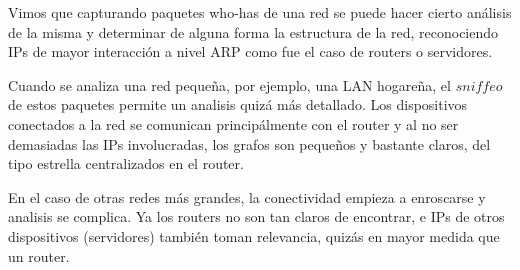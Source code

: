 Vimos que capturando paquetes who-has de una red se puede hacer cierto análisis
de la misma y determinar de alguna forma la estructura de la red, reconociendo
IPs de mayor interacción a nivel ARP como fue el caso de routers o servidores.

Cuando se analiza una red pequeña, por ejemplo, una LAN hogareña, el $sniffeo$
de estos paquetes permite un analisis quizá más detallado. Los dispositivos 
conectados a la red se comunican principálmente con el router y al no ser 
demasiadas las IPs involucradas, los grafos son pequeños y bastante claros, del
tipo estrella centralizados en el router.

En el caso de otras redes más grandes, la conectividad empieza a enroscarse y 
analisis se complica. Ya los routers no son tan claros de encontrar, e IPs de 
otros dispositivos (servidores) también toman relevancia, quizás en mayor medida
que un router. 
